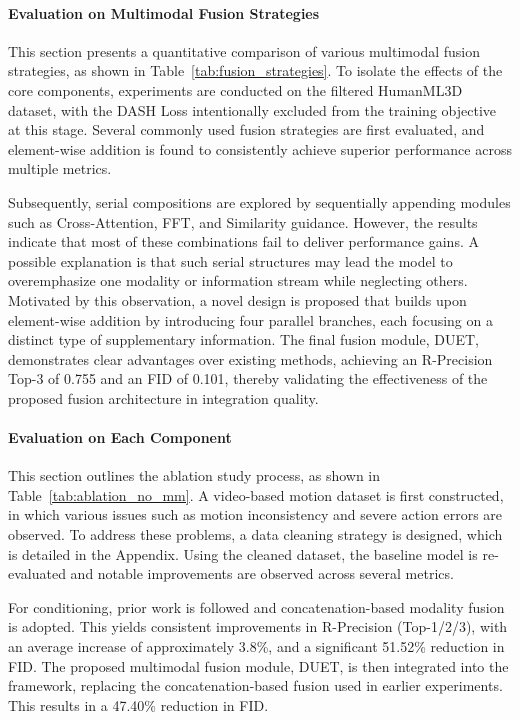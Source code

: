 \documentclass[a4paper,12pt]{article}
\begin{document}
\paragraph{Evaluation on Multimodal Fusion Strategies}
This section presents a quantitative comparison of various multimodal fusion strategies, as shown in Table~\ref{tab:fusion_strategies}. To isolate the effects of the core components, experiments are conducted on the filtered HumanML3D dataset, with the DASH Loss intentionally excluded from the training objective at this stage. Several commonly used fusion strategies are first evaluated, and element-wise addition is found to consistently achieve superior performance across multiple metrics.

Subsequently, serial compositions are explored by sequentially appending modules such as Cross-Attention, FFT, and Similarity guidance. However, the results indicate that most of these combinations fail to deliver performance gains. A possible explanation is that such serial structures may lead the model to overemphasize one modality or information stream while neglecting others. Motivated by this observation, a novel design is proposed that builds upon element-wise addition by introducing four parallel branches, each focusing on a distinct type of supplementary information. The final fusion module, DUET, demonstrates clear advantages over existing methods, achieving an R-Precision Top-3 of 0.755 and an FID of 0.101, thereby validating the effectiveness of the proposed fusion architecture in integration quality.


\paragraph{Evaluation on Each Component}
This section outlines the ablation study process, as shown in Table~\ref{tab:ablation_no_mm}. A video-based motion dataset is first constructed, in which various issues such as motion inconsistency and severe action errors are observed. To address these problems, a data cleaning strategy is designed, which is detailed in the Appendix. Using the cleaned dataset, the baseline model is re-evaluated and notable improvements are observed across several metrics. 

For conditioning, prior work is followed and concatenation-based modality fusion~\cite{chen2023executing} is adopted. This yields consistent improvements in R-Precision (Top-1/2/3), with an average increase of approximately 3.8\%, and a significant 51.52\% reduction in FID. The proposed multimodal fusion module, DUET, is then integrated into the framework, replacing the concatenation-based fusion used in earlier experiments. This results in a 47.40\% reduction in FID.
\end{document}
